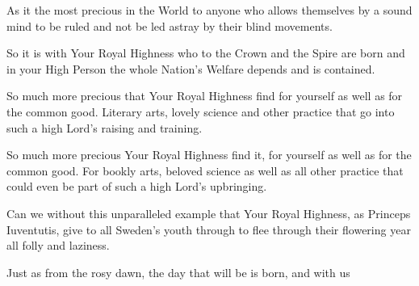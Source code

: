 
\newpage





As it the most precious in the World to anyone who allows themselves by a
sound mind to be ruled and not be led astray by their blind
movements. 

So it is with Your Royal Highness who to the Crown and the
Spire are born and in your High Person the whole Nation's Welfare
depends and is contained. 

So much more precious that Your Royal
Highness find for yourself as well as for the common good. Literary
arts, lovely science and other practice that go into such a high Lord's 
raising and training. 

So much more precious Your Royal Highness find
it,  for yourself as well as for the common good. For bookly arts,
beloved science as well as all other practice that could even be part of
such a high Lord's upbringing.

Can we without this unparalleled example that Your Royal Highness, as
Princeps Iuventutis, give to all Sweden's youth through to flee
through their flowering year all folly and laziness. 

Just as from the rosy dawn, the day that will be is born, and with us 
